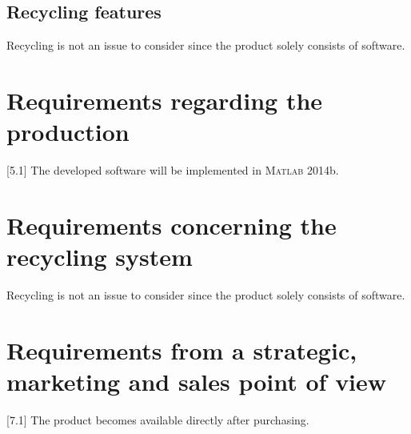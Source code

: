 \documentclass{tudelft-report}
\newcommand{\matlab}{\textsc{Matlab} } %
\begin{document}
\subsection{Recycling features}
Recycling is not an issue to consider since the product solely consists of software.
\section{Requirements regarding the production}
[5.1] The developed software will be implemented in \matlab 2014b.

\section{Requirements concerning the recycling system}
Recycling is not an issue to consider since the product solely consists of software.

\section{Requirements from a strategic, marketing and sales point of view}
[7.1] The product becomes available directly after purchasing.


%

%
\end{document}
